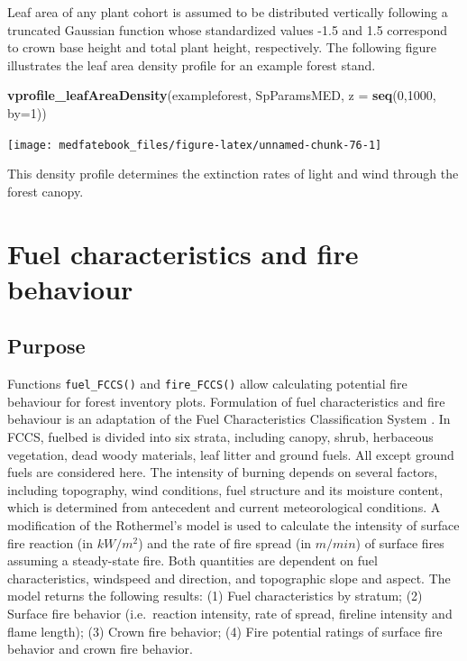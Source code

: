 \documentclass[]{book}
\newenvironment{Shaded}{\begin{snugshade}}{\end{snugshade}}
\newcommand{\KeywordTok}[1]{\textcolor[rgb]{0.13,0.29,0.53}{\textbf{#1}}}
\newcommand{\DataTypeTok}[1]{\textcolor[rgb]{0.13,0.29,0.53}{#1}}
\newcommand{\DecValTok}[1]{\textcolor[rgb]{0.00,0.00,0.81}{#1}}
\newcommand{\NormalTok}[1]{#1}
\begin{document}
Leaf area of any plant cohort is assumed to be distributed vertically following a truncated Gaussian function whose standardized values -1.5 and 1.5 correspond to crown base height and total plant height, respectively. The following figure illustrates the leaf area density profile for an example forest stand.

\begin{Shaded}
\begin{Highlighting}[]
\KeywordTok{vprofile_leafAreaDensity}\NormalTok{(exampleforest, SpParamsMED, }\DataTypeTok{z =} \KeywordTok{seq}\NormalTok{(}\DecValTok{0}\NormalTok{,}\DecValTok{1000}\NormalTok{, }\DataTypeTok{by=}\DecValTok{1}\NormalTok{))}
\end{Highlighting}
\end{Shaded}

\begin{center}\texttt{[image: medfatebook\_files/figure-latex/unnamed-chunk-76-1]} \end{center}

This density profile determines the extinction rates of light and wind through the forest canopy.

\hypertarget{fuel-characteristics-and-fire-behaviour}{%
\chapter{Fuel characteristics and fire behaviour}\label{fuel-characteristics-and-fire-behaviour}}

\hypertarget{purpose-1}{%
\section{Purpose}\label{purpose-1}}

Functions \texttt{fuel\_FCCS()} and \texttt{fire\_FCCS()} allow calculating potential fire behaviour for forest inventory plots. Formulation of fuel characteristics and fire behaviour is an adaptation of the Fuel Characteristics Classification System \citep[FCCS;][]{Prichard2013}. In FCCS, fuelbed is divided into six strata, including canopy, shrub, herbaceous vegetation, dead woody materials, leaf litter and ground fuels. All except ground fuels are considered here. The intensity of burning depends on several factors, including topography, wind conditions, fuel structure and its moisture content, which is determined from antecedent and current meteorological conditions. A modification of the Rothermel's \citeyearpar{Rothermel1972} model is used to calculate the intensity of surface fire reaction (in \(kW/m^2\)) and the rate of fire spread (in \(m/min\)) of surface fires assuming a steady-state fire. Both quantities are dependent on fuel characteristics, windspeed and direction, and topographic slope and aspect. The model returns the following results: (1) Fuel characteristics by stratum; (2) Surface fire behavior (i.e.~reaction intensity, rate of spread, fireline intensity and flame length); (3) Crown fire behavior; (4) Fire potential ratings of surface fire behavior and crown fire behavior.
\end{document}
